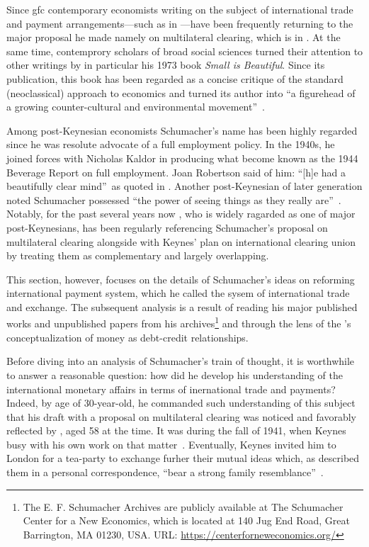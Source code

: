 Since \acf{gfc} contemporary economists writing on the subject of international trade and payment arrangements---such as in \citep{rossi2006,kregel2021_,kregel2023,patalano2023,faudot2021,faudot2022}---have been frequently returning to the major proposal he made namely on multilateral clearing, which is in \citep{schumacher1943}. At the same time, contemprory scholars of broad social sciences turned their attention to other writings by \citeauthor{schumacher1943} in particular his 1973 book \textit{Small is Beautiful}. Since its publication, this book has been regarded as a concise critique of the standard (neoclassical) approach to economics and turned its author into ``a figurehead of a growing counter-cultural and environmental movement''~\citep[p.~168]{leonard2022}.

Among post-Keynesian economists Schumacher's name has been highly regarded since he was resolute advocate of a full employment policy. In the 1940s, he joined forces with Nicholas Kaldor in producing what become known as the 1944 Beverage Report on full employment. Joan Robertson said of him: ``[h]e had a beautifully clear mind''~as quoted in \citep[p.~170]{leonard2022}. Another post-Keynesian of later generation noted Schumacher possessed ``the power of seeing things as they really are''~\citep[p.38]{chick2013}. Notably, for the past several years now \citeauthor{kregel2021_}, who is widely ragarded as one of major post-Keynesians, has been regularly referencing Schumacher's proposal on multilateral clearing alongside with Keynes' plan on international clearing union by treating them as complementary and largely overlapping.

This section, however, focuses on the details of Schumacher's ideas on reforming international payment system, which he called the sysem of international trade and exchange. The subsequent analysis is a result of reading his major published works and unpublished papers from his archives\footnote{The E. F. Schumacher Archives are publicly available at The Schumacher Center for a New Economics, which is located at 140 Jug End Road, Great Barrington, MA 01230, USA. URL: \url{https://centerforneweconomics.org/}} and through the lens of the \citeauthor{innes1913}'s conceptualization of money as debt-credit relationships.

Before diving into an analysis of Schumacher's train of thought, it is worthwhile to answer a reasonable question: how did he develop his understanding of the international monetary affairs in terms of inernational trade and payments? Indeed, by age of 30-year-old, he commanded such understanding of this subject that his draft with a proposal on multilateral clearing was noticed and  favorably reflected by \citeauthor{keynes1936}, aged 58 at the time. It was during the fall of 1941, when Keynes busy with his own work on that matter~\citep{keynes1980_25}. Eventually, Keynes invited him to London for a tea-party to exchange furher their mutual ideas which, as \citeauthor{keynes1936} described them in a personal correspondence, ``bear a strong family resemblance''~\citep{schumacher1941}.    

